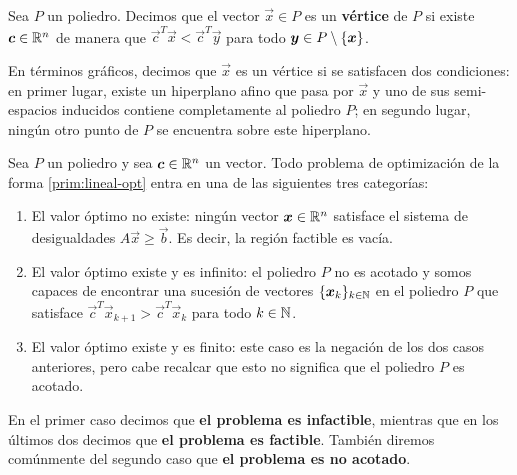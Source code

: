 \begin{definition}
	Sea $P$ un poliedro. Decimos que el vector $\vec{x} \in P$ es un \textbf{vértice} de $P$ si existe
	$\boldsymbol{c} \in \mathbb{R}^n$ de manera que $\vec{c}^T\vec{x} < \vec{c}^T\vec{y}$ para todo $\boldsymbol{y} \in P
	\setminus \lbrace \boldsymbol{x} \rbrace$.
\end{definition}

En términos gráficos, decimos que $\vec{x}$ es un vértice si se satisfacen dos condiciones: en
primer lugar, existe un hiperplano afino que pasa por $\vec{x}$ y uno de sus semi-espacios inducidos
contiene completamente al poliedro $P$; en segundo lugar, ningún otro punto de $P$ se encuentra
sobre este hiperplano.

\begin{definition}
Sea $P$ un poliedro y sea $\boldsymbol{c} \in \mathbb{R}^n$ un vector. Todo problema de optimización de la forma
\eqref{prim:lineal-opt} entra en una de las siguientes tres categorías:
\begin{enumerate}
	\item El valor óptimo no existe: ningún vector $\boldsymbol{x} \in \mathbb{R}^n$ satisface
		el sistema de desigualdades $A\vec{x} \geq \vec{b}$. Es decir, la región factible es vacía.
	\item El valor óptimo existe y es infinito: el poliedro $P$ no es acotado y
		somos capaces de encontrar una sucesión de vectores $\lbrace \boldsymbol{x}_k \rbrace_{k \in \mathbb{N}}$
		en el poliedro $P$ que satisface $\vec{c}^T\vec{x}_{k+1} > \vec{c}^T\vec{x}_k$ para todo $k \in \mathbb{N}$.
	\item El valor óptimo existe y es finito: este caso es la negación de los dos casos anteriores,
		pero cabe recalcar que esto no significa que el poliedro $P$ es acotado.
\end{enumerate}
En el primer caso decimos que \textbf{el problema es infactible}, mientras que en los últimos dos
decimos que \textbf{el problema es factible}. También diremos comúnmente del segundo caso que
\textbf{el problema es no acotado}.
\end{definition}

